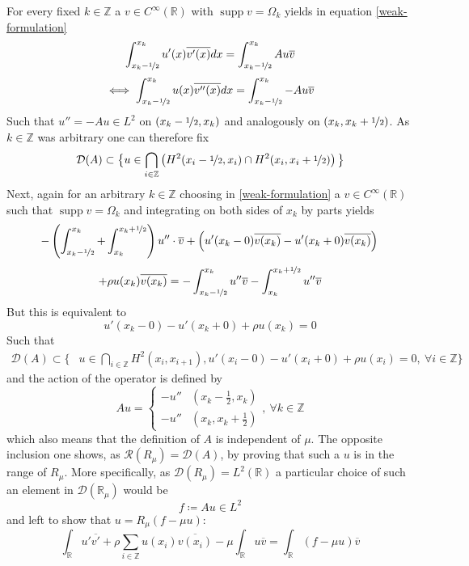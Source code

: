 \documentclass[fontsize=14pt,a4paper,DIV=1]{scrartcl}
\numberwithin{equation}{section}
\def\supp{\operatorname{supp}}
\newcommand{\R}{\mathbb{R}}
\newcommand{\Z}{\mathbb{Z}}
\begin{document}
For every fixed $k \in \Z$ a $v \in C^{\infty}(\R)$ with $\supp v = \Omega_{k}$ yields in equation \eqref{weak-formulation}
	\[ \int_{x_{k}-\nicefrac{1}{2}}^{x_{k}} u'(x) \overline{v'(x)} dx = \int_{x_{k}-\nicefrac{1}{2}}^{x_{k}} A u \overline{v} \]
	\[ \iff \int_{x_{k}-\nicefrac{1}{2}}^{x_{k}} u(x) \overline{v''(x)} dx = \int_{x_{k}-\nicefrac{1}{2}}^{x_{k}} - A u \overline{v} \]
Such that $u'' = - A u \in L^{2}$ on $(x_{k} -\nicefrac{1}{2}, x_{k})$ and analogously on $(x_{k}, x_{k} + \nicefrac{1}{2})$.
As $k \in \Z$ was arbitrary one can therefore fix
	\[ \mathcal{D}(A) \subset \big\{ u \in \bigcap_{i \in \Z} \left( H^{2}(x_{i}-\nicefrac{1}{2}, x_{i}) \cap H^{2}(x_{i}, x_{i} + \nicefrac{1}{2}) \right)\big\} \]
Next, again for an arbitrary $k \in \Z$ choosing in \eqref{weak-formulation} a $v \in C^{\infty}(\R)$ such that $\supp v = \Omega_{k}$ and integrating on both sides of $x_{k}$ by parts yields
	\[ -\left( \int_{x_{k}-\nicefrac{1}{2}}^{x_{k}} + \int_{x_{k}}^{x_{k} + \nicefrac{1}{2}}\right) u'' \cdot \overline{v} + \left( u'(x_{k}-0) \overline{v(x_{k})} - u'(x_{k} + 0) \overline{v(x_{k})} \right) \\ \]
	\[ +  \rho u(x_{k})\overline{v(x_{k})} = - \int_{x_{k} - \nicefrac{1}{2}}^{x_{k}} u'' \overline{v} - \int_{x_{k}}^{x_{k} + \nicefrac{1}{2}} u'' \overline{v} \]
But this is equivalent to
	\[ u'(x_{k}-0) - u'(x_{k}+0) + \rho u(x_{k}) = 0 \]
Such that
	\begin{align*}
		\mathcal{D}(A) \subset \big\{ & u \in \bigcap_{i \in \Z} H^{2}(x_{i}, x_{i + 1}), u'(x_{i} - 0) - u'(x_{i} + 0) + \rho u(x_{i}) = 0 , ~\forall i \in \Z \big\}
	\end{align*} 
	and the action of the operator is defined by
		\[ A u = \begin{cases}
					- u'' & (x_{k} - \frac{1}{2}, x_{k}) \\
					- u'' & (x_{k}, x_{k} + \frac{1}{2})
				 \end{cases}, ~\forall k \in \Z \]
	which also means that the definition of $A$ is independent of $\mu$. 
	The opposite inclusion one shows, as $\mathcal{R}(R_{\mu}) = \mathcal{D}(A)$, by proving that such a $u$ is in the range of $R_{\mu}$. More specifically, as $\mathcal{D}(R_{\mu}) = L^{2}(\R)$ a particular choice  of such an element in  $\mathcal{D}(\R_{\mu})$ would be
	\[ f \coloneqq A u \in L^{2} \] 
	and left to show that $u = R_{\mu}(f - \mu u)$:
	\[ \int_{\R} u' \overline{v'} + \rho \sum_{i \in \Z} u(x_{i}) \overline{v(x_{i})} - \mu \int_{\R} u \overline{v}= \int_{\R}(f-\mu u) \overline{v} \]
\end{document}
